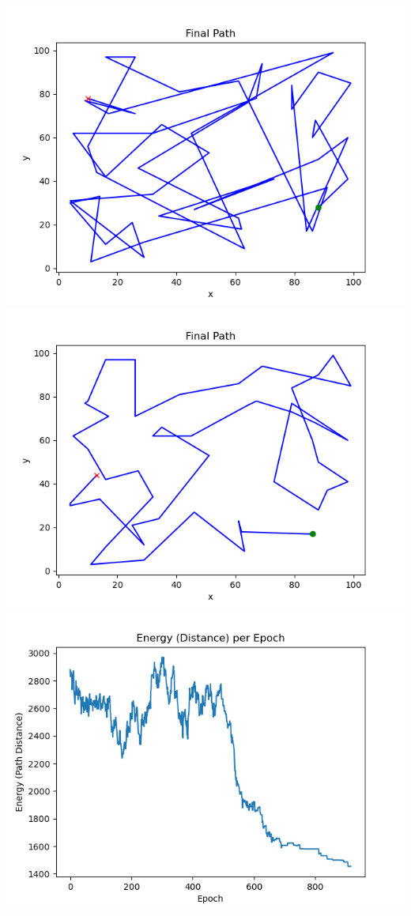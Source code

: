 \documentclass[a4paper,10pt]{article}
\begin{document}
\includegraphics[scale=0.5]{latexGraphs/3_final_path.png}
\includegraphics[scale=0.5]{latexGraphs/4_final_path.png}
\includegraphics[scale=0.5]{latexGraphs/3_energy.png}
\end{document}
